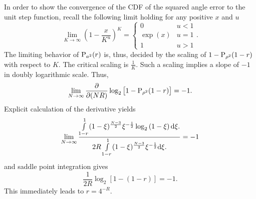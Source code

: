 \documentclass[twocolumn]{IEEEtran}
\begin{document}
In order to show the convergence of the CDF of the squared angle error to the unit step function, recall the following limit holding for any positive $x$ and $u$
\begin{equation}
\lim\limits_{K\to\infty}\left(
1- \frac x{K^u}
\right)^K = \left\{
\begin{array}{ll}
0 & u<1\\
\exp(x) & u=1\\
1 & u >1
\end{array}
\right..
\end{equation}
The limiting behavior of ${\text P}_{a^2}(r)$ is, thus, decided by the scaling of $1-{\text P}_{\rho^2}(1-r)$ with respect to $K$. The critical scaling is $\frac 1K$.
Such a scaling implies a slope of $-1$ in doubly logarithmic scale.
Thus,
\begin{equation}
\lim\limits_{N\to\infty} \frac{\partial}{\partial (NR)}
\log_2 \left[1 - {\text P}_{\rho^2}(1-r)\right]  = -1.
\end{equation}
Explicit calculation of the derivative yields
\begin{equation}
\lim\limits_{N\to\infty}
\frac{
\int\limits^1_{1-r} (1-\xi)^{\frac {N-3}2 }\xi^{-\frac12} 
 \log_2\left(1-\xi\right)
{\text d}\xi.
}{2R
\int\limits^1_{1-r} (1-\xi)^{\frac {N-3}2} \xi^{-\frac12}  {\text d}\xi.
}=-1
\end{equation}
and saddle point integration gives \cite[Chapter 4]{merhav2010statistical}
\begin{equation}
\frac 1{2R} \log_2[1-(1- r)] =-1.
\end{equation}
This immediately leads to $r =4^{-R}$.







\end{document}
